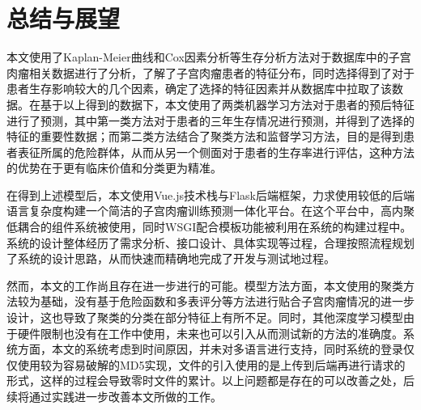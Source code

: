 \chapter{总结与展望}
\label{cha:summary}

本文使用了Kaplan-Meier曲线和Cox因素分析等生存分析方法对于数据库中的子宫肉瘤相关数据进行了分析，了解了子宫肉瘤患者的特征分布，同时选择得到了对于患者生存影响较大的几个因素，确定了选择的特征因素并从数据库中拉取了该数据。在基于以上得到的数据下，本文使用了两类机器学习方法对于患者的预后特征进行了预测，其中第一类方法对于患者的三年生存情况进行预测，并得到了选择的特征的重要性数据；而第二类方法结合了聚类方法和监督学习方法，目的是得到患者表征所属的危险群体，从而从另一个侧面对于患者的生存率进行评估，这种方法的优势在于更有临床价值和分类更为精准。

在得到上述模型后，本文使用Vue.js技术栈与Flask后端框架，力求使用较低的后端语言复杂度构建一个简洁的子宫肉瘤训练预测一体化平台。在这个平台中，高内聚低耦合的组件系统被使用，同时WSGI配合模板功能被利用在系统的构建过程中。系统的设计整体经历了需求分析、接口设计、具体实现等过程，合理按照流程规划了系统的设计思路，从而快速而精确地完成了开发与测试地过程。

然而，本文的工作尚且存在进一步进行的可能。模型方法方面，本文使用的聚类方法较为基础，没有基于危险函数和多表评分等方法进行贴合子宫肉瘤情况的进一步设计，这也导致了聚类的分类在部分特征上有所不足。同时，其他深度学习模型由于硬件限制也没有在工作中使用，未来也可以引入从而测试新的方法的准确度。系统方面，本文的系统考虑到时间原因，并未对多语言进行支持，同时系统的登录仅仅使用较为容易破解的MD5实现，文件的引入使用的是上传到后端再进行请求的形式，这样的过程会导致零时文件的累计。以上问题都是存在的可以改善之处，后续将通过实践进一步改善本文所做的工作。